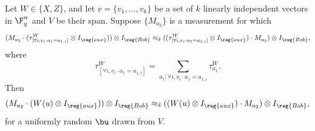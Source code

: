 \begin{lemma}\label{lem:proj-to-obs-subspace}
Let $W \in \{X, Z\}$, and let $v = \{v_1, \dots, v_k\}$ be a set of
$k$ linearly independent vectors in $\F_q^n$ and $V$ be their span.
Suppose $\{M_{a_2}\}$ is a measurement for which
\begin{equation}\label{eq:m-commutes-subspace-proj}
(M_{a_2} \cdot (\tau^{W}_{[\forall i, v_i \cdot a_1 = a_{1,i}]} \otimes I_{\reg{aux}})) \otimes I_{\reg{Bob}}
\approx_{\delta} ((\tau^{W}_{[\forall i, v_i \cdot a_1 = a_{1,i}]} \otimes I_{\reg{aux}}) \cdot M_{a_2}) \otimes I_{\reg{Bob}},
\end{equation}
where
\[ \tau^{W}_{[\forall i, v_i \cdot a_1 = a_{1,i}]} = \sum_{a_1 :
    \forall i, v_i \cdot a_1 = a_{1,i}} \tau^W_{a_1}. \]
Then
\begin{equation*}
(M_{a_2} \cdot (W(u)\otimes I_{\reg{aux}})) \otimes I_{\reg{Bob}}
\approx_{\delta} ((W(u) \otimes I_{\reg{aux}}) \cdot M_{a_2}) \otimes I_{\reg{Bob}},
\end{equation*}
for a uniformly random $\bu$ drawn from $V$.
\end{lemma}
